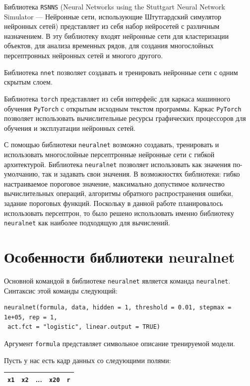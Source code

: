 \documentclass[12pt]{article}
\begin{document}
  Библиотека \verb|RSNNS| (Neural Networks using the Stuttgart Neural Network Simulator --- Нейронные сети, использующие Штутгардский симулятор нейронных сетей) представляет из себя набор нейросетей с различным назначением. В эту библиотеку входят нейронные сети для кластеризации объектов, для анализа временных рядов, для создания многослойных персептронных нейронных сетей и многого другого.

  Библиотека \verb|nnet| позволяет создавать и тренировать нейронные сети с одним скрытым слоем.

  Библиотека \verb|torch| представляет из себя интерфейс для каркаса машинного обучения \verb|PyTorch| с открытым исходным текстом программы. Каркас \verb|PyTorch| позволяет использовать вычислительные ресурсы графических процессоров для обучения и эксплуатации нейронных сетей.

  С помощью библиотеки \verb|neuralnet| возможно создавать, тренировать и использовать многослойные персептронные нейронные сети с гибкой архитектурой. Библиотека \verb|neuralnet| позволяет использовать как значения по-умолчанию, так и задавать свои значения. В возможностях библиотеки: гибко настраиваемое пороговое значение, максимально допустимое количество вычислительных операций, алгоритмы обратного распространения ошибки, задание пороговых функций. Поскольку в данной работе планировалось использовать персептрон, то было решено использовать именно библиотеку \verb|neuralnet| как наиболее подходящую для вычислений.

  \section{Особенности библиотеки neuralnet}

  Основной командой в библиотеке \verb|neuralnet| является команда \verb|neuralnet|. Синтаксис этой команды следующий:

\begin{verbatim}
neuralnet(formula, data, hidden = 1, threshold = 0.01, stepmax = 1e+05, rep = 1,
 act.fct = "logistic", linear.output = TRUE)
\end{verbatim}

  Аргумент \verb|formula| представляет символьное описание тренируемой модели.

  Пусть у нас есть кадр данных со следующими полями:

  \begin{tabular}{|c|c|c|c|c|}
    \hline
    \verb|x1| & \verb|x2| & ... & \verb|x20| & \verb|r| \\ \hline
  \end{tabular}
\end{document}
